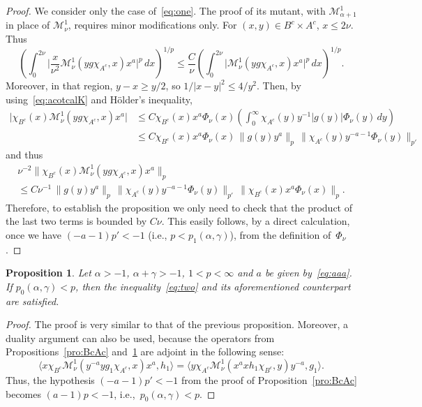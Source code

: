\documentclass[a4paper]{amsart}
\newcommand{\calM}{\mathcal{M}}
\newtheorem{propo}{Proposition}
\begin{document}
\begin{proof}
We consider only the case of~\eqref{eq:one}.
The proof of its mutant, with $\calM_{\alpha+1}^1$
in place of $\calM_\nu^1$,
requires minor modifications only.
For $(x,y) \in B^c \times A^c$, $x \le 2\nu$. Thus
\begin{equation*}
  \left( \int_0^{2\nu} \Big| \frac{x}{\nu^2}
    \calM_\nu^1(yg\chi_{A^c},x)x^a \Big|^p \,dx \right)^{1/p}
  \le \frac{C}{\nu} \left(\int_0^{2\nu} \big|
    \calM_\nu^1(yg\chi_{A^c},x)x^a \big|^p \,dx\right)^{1/p}.
\end{equation*}
Moreover, in that region,  $y-x\ge y/2$, so $1/|x-y|^2 \le 4/y^2$.
Then, by using~\eqref{eq:acotcalK} and H\"older's inequality,
\begin{align*}
  \big| \chi_{B^c}(x) \calM_\nu^1(yg\chi_{A^c},x)x^a \big|
  &\le C \chi_{B^c}(x)x^a\Phi_\nu(x)
    \left(\int_0^\infty\chi_{A^c}(y) y^{-1}|g(y)| \Phi_\nu(y) \,dy \right) \\
  &\le C \chi_{B^c}(x) x^a \Phi_\nu(x)\,\| g(y) y^a\|_p \,
    \|\chi_{A^c}(y) y^{-a-1} \Phi_\nu(y) \|_{p'}
\end{align*}
and thus
\begin{multline*}
 \nu^{-2} \| \chi_{B^c}(x) \calM_\nu^1(yg\chi_{A^c},x)x^a \|_p \\
  \le C \nu^{-1}\, \| g(y) y^a\|_p\,
  \|\chi_{A^c}(y) y^{-a-1} \Phi_\nu(y) \|_{p'}\,
  \|\chi_{B^c}(x) x^a \Phi_{\nu}(x) \|_p.
\end{multline*}
Therefore, to establish the proposition we only need to check that
the product of the last two terms is bounded by $C\nu$.
This easily follows, by a direct calculation, once we have $(-a-1)p'<-1$
(i.e., $p<p_1(\alpha,\gamma)$),
from the definition of~$\Phi_\nu$.
\end{proof}

\begin{propo}
\label{pro:AcBc}
Let $\alpha>-1$, $\alpha+\gamma>-1$, $1<p<\infty$ and $a$ be given
by~\eqref{eq:aaa}.
If $p_0(\alpha,\gamma)<p$, then the inequality~\eqref{eq:two}
and its aforementioned counterpart are satisfied.
\end{propo}

\begin{proof}
The proof is very similar to that of the previous proposition.
Moreover, a duality argument can also  be used, because the operators
from Propositions~\ref{pro:BcAc} and~\ref{pro:AcBc} are adjoint in
the following sense:
\begin{equation*}
  \langle  x\chi_{B^c} \calM_\nu^1(y^{-a}yg_1\chi_{A^c},x) x^a, h_1 \rangle
  = \langle  y\chi_{A^c} \calM_\nu^1(x^axh_1\chi_{B^c},y) y^{-a}, g_1 \rangle.
\end{equation*}
Thus, the hypothesis $(-a-1)p' < -1$ from the proof of Proposition~\ref{pro:BcAc}
becomes $(a-1)p < -1$, i.e.,~$p_0(\alpha,\gamma)<p$.
\end{proof}
\end{document}
